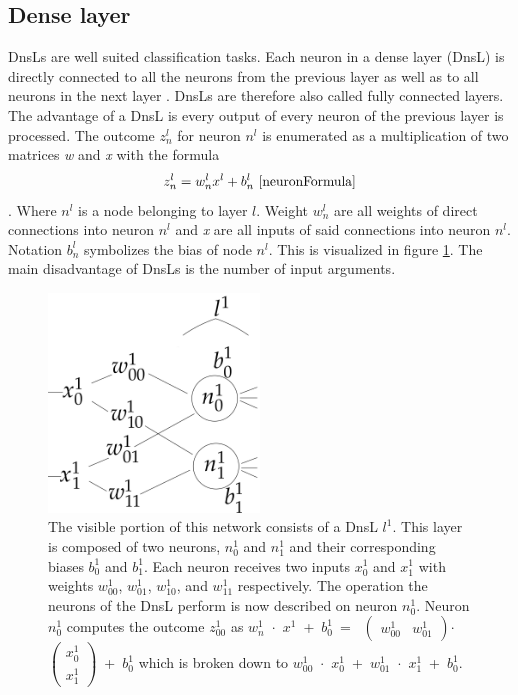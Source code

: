 \subsection{Dense layer}\label{denseLayers}
DnsLs are well suited classification tasks. Each neuron in a dense layer (DnsL) is directly connected to all the neurons from the previous layer as well as to all neurons in the next layer \cite{CNN}. DnsLs are therefore also called fully connected layers. The advantage of a DnsL is every output of every neuron of the previous layer is processed. The outcome ${z^l_n}$ for neuron ${n^l}$  is enumerated as a multiplication of two matrices \textit{w} and \textit{x} with the formula \[{z^l_{n}}=w^l_n  x^l + b^l_n~\cite{neuronFormula}\]. Where ${n^l}$ is a node belonging to layer ${l}$. Weight ${w^l_n}$ are all weights of direct connections into neuron ${n^l}$ and \textit{x} are all inputs of said connections into neuron ${n^l}$. Notation ${b^l_n}$ symbolizes the bias of node ${n^l}$. This is visualized in figure \ref{denseLayerVisualization}. The main disadvantage of DnsLs is the number of input arguments.
\begin{figure}
  \includegraphics[width=0.5\textwidth]{Images/denseLayer.png}
  \caption[rightcaption]{The visible portion of this network consists of a DnsL ${l^1}$. This layer is composed of two neurons, ${n^1_0}$ and ${n^1_1}$ and their corresponding biases ${b^1_0}$ and ${b^1_1}$. Each neuron receives two inputs ${x^1_{0}}$ and ${x^1_{1}}$ with weights ${w^1_{00}}$, ${w^1_{01}}$, ${w^1_{10}}$, and ${w^1_{11}}$ respectively. The operation the neurons of the DnsL perform is now described on neuron ${n^1_{0}}$. Neuron ${n^1_{0}}$ computes the outcome ${z^1_{00}}$ as 
${w^1_{n}}$~$\cdot$~${x^1}$~+~${b^1_0}$~=~
 $\left(\begin{smallmatrix}{w^1_{00}}&{w^1_{01}}\end{smallmatrix}\right)$$\cdot$$\left(\begin{smallmatrix}{x^1_{0}}\\{x^1_{1}}\end{smallmatrix}\right)$~+~${b^1_0}$
which is broken down to ${w^1_{00}}$~$\cdot$~${x^1_{0}}$~+~${w^1_{01}}$~$\cdot$~${x^1_{1}}$~+~${b^1_0}$.
}
  \label{denseLayerVisualization}
\end{figure} 


